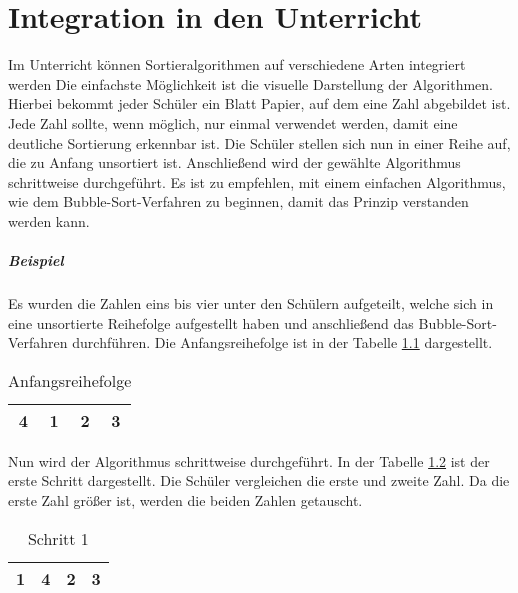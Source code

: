 \documentclass[./entry.tex]{subfiles}
\begin{document}
    \chapter{Integration in den Unterricht}

    Im Unterricht können Sortieralgorithmen auf verschiedene Arten integriert werden
    Die einfachste Möglichkeit ist die visuelle Darstellung der Algorithmen.
    Hierbei bekommt jeder Schüler ein Blatt Papier, auf dem eine Zahl abgebildet ist.
    Jede Zahl sollte, wenn möglich, nur einmal verwendet werden, damit eine deutliche Sortierung erkennbar ist.
    Die Schüler stellen sich nun in einer Reihe auf, die zu Anfang unsortiert ist.
    Anschließend wird der gewählte Algorithmus schrittweise durchgeführt.
    Es ist zu empfehlen, mit einem einfachen Algorithmus, wie dem \dq Bubble-Sort\dq-Verfahren zu beginnen,
    damit das Prinzip verstanden werden kann.

    \paragraph{Beispiel}
    Es wurden die Zahlen eins bis vier unter den Schülern aufgeteilt, welche sich in eine
    unsortierte Reihefolge aufgestellt haben und anschließend das \dq Bubble-Sort\dq-Verfahren
    durchführen. Die Anfangsreihefolge ist in der Tabelle \ref{tab:lessons-unsorted} dargestellt.

    \begin{table}[h]
        \centering
        \begin{tabular}{|c|c|c|c|}
            \hline
            4 & 1 & 2 & 3 \\
            \hline
        \end{tabular}
        \caption{Anfangsreihefolge}
        \label{tab:lessons-unsorted}
    \end{table}

    Nun wird der Algorithmus schrittweise durchgeführt.
    In der Tabelle \ref{tab:lessons-step1} ist der erste Schritt dargestellt.
    Die Schüler vergleichen die erste und zweite Zahl.
    Da die erste Zahl größer ist, werden die beiden Zahlen getauscht.

    \begin{table}[h]
        \centering
        \begin{tabular}{|c|c|c|c|}
            \hline
            1 & 4 & 2 & 3 \\
            \hline
        \end{tabular}
        \caption{Schritt 1}
        \label{tab:lessons-step1}
    \end{table}
\end{document}
